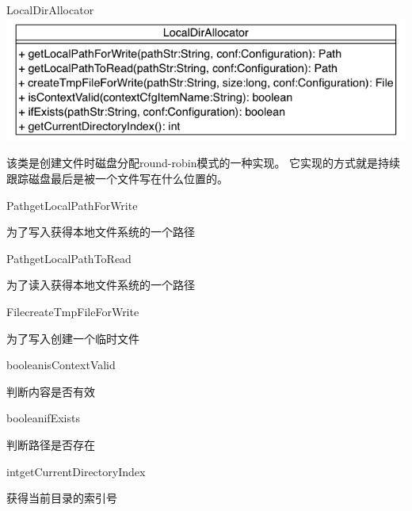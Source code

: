 \begin{XeClass}{LocalDirAllocator}
\includegraphics[width=\textwidth]{cdig/LocalDirAllocator.png}
     
 该类是创建文件时磁盘分配round-robin模式的一种实现。
 它实现的方式就是持续跟踪磁盘最后是被一个文件写在什么位置的。

    \begin{XeMethod}{\XePublic}{Path}{getLocalPathForWrite}
         
 为了写入获得本地文件系统的一个路径

    \end{XeMethod}

    \begin{XeMethod}{\XePublic}{Path}{getLocalPathToRead}
         
 为了读入获得本地文件系统的一个路径

    \end{XeMethod}

    \begin{XeMethod}{\XePublic}{File}{createTmpFileForWrite}
         
 为了写入创建一个临时文件

    \end{XeMethod}

    \begin{XeMethod}{\XePublic}{boolean}{isContextValid}
         
 判断内容是否有效

    \end{XeMethod}

    \begin{XeMethod}{\XePublic}{boolean}{ifExists}
         
 判断路径是否存在

    \end{XeMethod}

    \begin{XeMethod}{}{int}{getCurrentDirectoryIndex}
         
 获得当前目录的索引号

    \end{XeMethod}


\end{XeClass}
